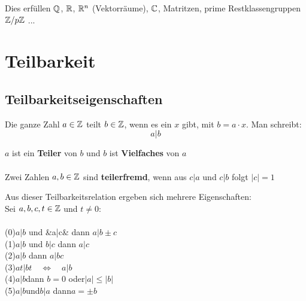 Dies erfüllen $\mathbb{Q}$, $\mathbb{R}$, $\mathbb{R}^{n}$ (Vektorräume), $\mathbb{C}$, Matritzen, prime Restklassengruppen $\mathbb{Z} / p\mathbb{Z}$ ...


	\section{Teilbarkeit}

	\subsection{Teilbarkeitseigenschaften}

\begin{Definition}
Die ganze Zahl $a\in\mathbb{Z}$ teilt $b\in\mathbb{Z}$, wenn es ein $x$ gibt, mit $b=a\cdot x$. Man schreibt:
$$a|b$$

$a$ ist ein \textbf{Teiler} von $b$ und $b$ ist \textbf{Vielfaches} von $a$\\\\

Zwei Zahlen $a,b\in\mathbb{Z}$  sind \textbf{teilerfremd}, wenn aus $ c | a  $ und $c|b$ folgt $|c|=1$
\end{Definition}

\begin{Theorem}
Aus dieser Teilbarkeitsrelation ergeben sich mehrere Eigenschaften:\\
Sei $a,b,c,t\in\mathbb{Z}$ und $t\neq0$:\\\\
(0)\qquad$a|b$ \quad und \quad&a|c& \quad dann \quad $a|b\pm c $\\ 
(1)\qquad$a|b$ \quad und \quad$b|c$ \quad dann \quad $a|c$\\
(2)\qquad$a|b$ \quad dann \quad $a|bc$\\
(3)\qquad$at|bt\quad\Leftrightarrow\quad a|b$\\
(4)\qquad$a|b$\quad dann \quad $b=0$ \quad oder\quad $|a| \leq |b| $\\
(5)\qquad$a|b$\quad und\quad $b|a$ \quad dann\quad $a=\pm b$
\end{Theorem}

